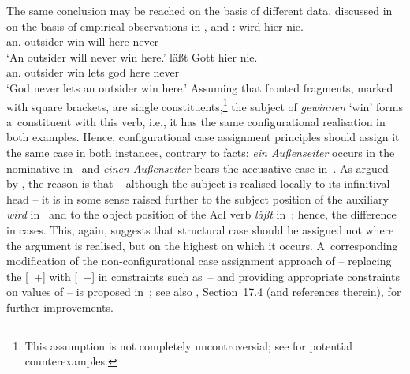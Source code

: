 \documentclass[output=paper]{langsci/langscibook}
\begin{document}
The same conclusion may be reached on the basis of different data, discussed in \citealt{Meurers99c,Meurers99b} on the basis of empirical observations in \citealt{Haider90a}, \citealt{Grewendorf94a} and \citealt{Mueller97c-Eng-Short-Cross}:
\eal
\ex \label{win:ss}
 wird hier nie. \\
     \phtm{[}an.\NOM{} outsider win\INF{} will here never\\
\glt  `An outsider will never win here.'
\ex
\label{win:so}
 läßt Gott hier nie. \\
    \phtm{[}an.\ACC{} outsider win\INF{} lets god here never\\
\glt `God never lets an outsider win here.'
\zl
Assuming that fronted fragments, marked with square brackets, are single constituents,\footnote{This assumption is not completely uncontroversial; see \citet[100–101]{Kiss94} for potential counterexamples.} the subject of \emph{gewinnen} `win’ forms a~constituent with this verb, i.e., it has the same configurational realisation in both examples.  Hence, configurational case assignment principles should assign it the same case in both instances, contrary to facts: \emph{ein Außenseiter} occurs in the nominative in~ and \emph{einen Außenseiter} bears the accusative case in~.  As argued by \citealt{Meurers99c,Meurers99b}, the reason is that – although the subject is realised locally to its infinitival head – it is in some sense raised further to the subject position of the auxiliary \emph{wird} in~ and to the object position of the AcI verb \emph{läßt} in~; hence, the difference in cases.  This, again, suggests that structural case should be assigned not where the argument is realised, but on the highest  on which it occurs.  A~corresponding modification of the non-configurational case assignment approach of \citealt{prze:96,Prze99,Prze99b} – replacing the [~$+$] with [~$-$] in constraints such as~– and providing appropriate constraints on values of  – is proposed in~\citealt[93–95]{Prze99b}; see also \citealt{MuellerLehrbuch3}, Section~17.4 (and references therein), for further improvements.
\end{document}
